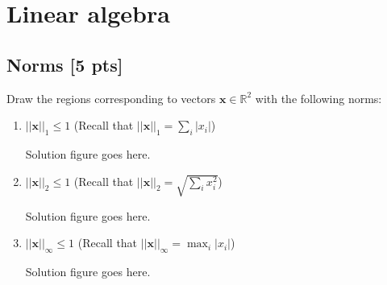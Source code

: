 \documentclass[a4paper]{article}
\theoremstyle{definition}
\newcommand{\RR}{\mathbb{R}}
\newenvironment{soln}{
	\leavevmode\color{blue}\ignorespaces
}{}
\begin{document}
	
	
	\section{Linear algebra}
	
	
	\subsection{Norms [5 pts]}
	Draw the regions corresponding to vectors $\mathbf{x}\in\RR^2$ with the following norms:
	\begin{enumerate}
		\item 	$||\mathbf{x}||_1\leq 1$ (Recall that $||\mathbf{x}||_1 = \sum_i |x_i|$)

	\begin{soln}
	    Solution figure goes here.\\
	\end{soln}
		
		\item 	$||\mathbf{x}||_2 \leq 1$ (Recall that $||\mathbf{x}||_2 =\sqrt{\sum_i x_i^2}$)
			\begin{soln}
			Solution figure goes here.\\
		\end{soln}
		\item 	$||\mathbf{x}||_\infty \leq 1$ (Recall that $||\mathbf{x}||_\infty = \max_i |x_i|$)
			\begin{soln}
			Solution figure goes here.\\
		\end{soln}
	\end{enumerate}
	
\end{document}
